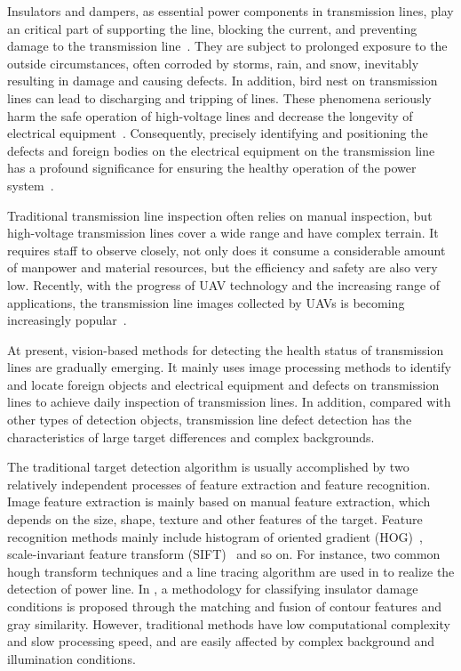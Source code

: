 \documentclass[sn-mathphys,Numbered]{sn-jnl}%
\theoremstyle{thmstyleone}%
\theoremstyle{thmstyletwo}%
\theoremstyle{thmstylethree}%
\begin{document}
Insulators and dampers, as essential power components in transmission lines, play an critical part of supporting the line, blocking the current, and preventing damage to the transmission line~\cite{zhao2020detection3}. They are subject to prolonged exposure to the outside circumstances, often corroded by storms, rain, and snow, inevitably resulting in damage and causing defects. In addition, bird nest on transmission lines can lead to discharging and tripping of lines. These phenomena seriously harm the safe operation of high-voltage lines and decrease the longevity of electrical equipment~\cite{ma2021real}. Consequently, precisely identifying and positioning the defects and foreign bodies on the electrical equipment on the transmission line has a profound significance for ensuring the healthy operation of the power system~\cite{mohamed2020unmanned}.

Traditional transmission line inspection often relies on manual inspection, but high-voltage transmission lines cover a wide range and have complex terrain. It requires staff to observe closely, not only does it consume a considerable amount of manpower and material resources, but the efficiency and safety are also very low. Recently, with the progress of UAV technology and the increasing range of applications, the transmission line images collected by UAVs  is becoming  increasingly popular~\cite{liang2020detection, zhang2004mobile, zhang2017uav,li2023focus}.

At present, vision-based methods for detecting the health status of transmission lines are gradually emerging. It mainly uses image processing methods to identify and locate foreign objects and electrical equipment and defects on transmission lines to achieve daily inspection of transmission lines. In addition, compared with other types of detection objects, transmission line defect detection has the characteristics of large target differences and complex backgrounds.

The traditional target detection algorithm is usually accomplished by two relatively independent processes of feature extraction and feature recognition. Image feature extraction is mainly based on manual feature extraction, which depends on the size, shape, texture and other features of the target. Feature recognition methods mainly include histogram of oriented gradient (HOG)~\cite{zaidi2022survey}, scale-invariant feature transform (SIFT)~\cite{tulbure2022review} and so on. For instance,  two common hough transform techniques and a line tracing algorithm are used in \cite{wei2022composite} to realize the detection of power line. In \cite{tan2020catenary}, a methodology for classifying insulator damage conditions is proposed through the matching and fusion of contour features and gray similarity. However, traditional methods have low computational complexity and slow processing speed, and are easily affected by complex background and illumination conditions.
\end{document}
